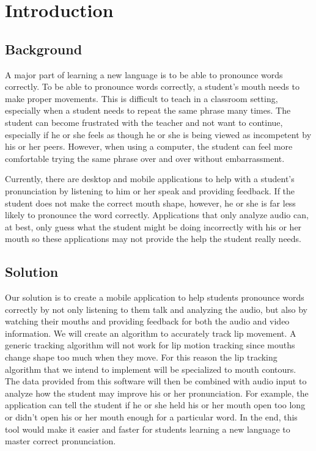 \chapter{Introduction}

\section{Background}

A major part of learning a new language is to be able to pronounce words correctly. To be able to pronounce words correctly, a student's mouth needs to make proper movements. This is difficult to teach in a classroom setting, especially when a student needs to repeat the same phrase many times. The student can become frustrated with the teacher and not want to continue, especially if he or she feels as though he or she is being viewed as incompetent by his or her peers. However, when using a computer, the student can feel more comfortable trying the same phrase over and over without embarrassment.

Currently, there are desktop and mobile applications to help with a student's pronunciation by listening to him or her speak and providing feedback. If the student does not make the correct mouth shape, however, he or she is far less likely to pronounce the word correctly. Applications that only analyze audio can, at best, only guess what the student might be doing incorrectly with his or her mouth so these applications may not provide the help the student really needs.

\section{Solution}

Our solution is to create a mobile application to help students pronounce words correctly by not only listening to them talk and analyzing the audio, but also by watching their mouths and providing feedback for both the audio and video information. We will create an algorithm to accurately track lip movement. A generic tracking algorithm will not work for lip motion tracking since mouths change shape too much when they move. For this reason the lip tracking algorithm that we intend to implement will be specialized to mouth contours. The data provided from this software will then be combined with audio input to analyze how the student may improve his or her pronunciation. For example, the application can tell the student if he or she held his or her mouth open too long or didn't open his or her mouth enough for a particular word. In the end, this tool would make it easier and faster for students learning a new language to master correct pronunciation. 